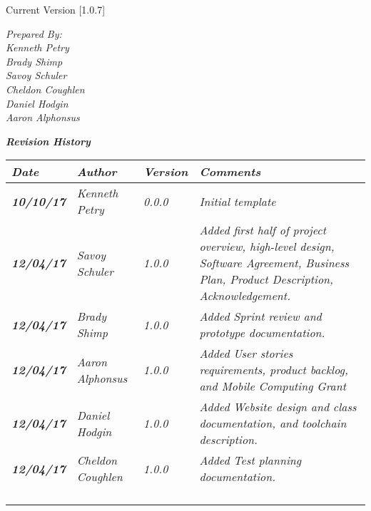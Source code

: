


Current Version [1.0.7]
\vspace*{5mm}

{\color{SDColor5}
\noindent
\textit{Prepared By:}\\
\textit{Kenneth Petry}\\
\textit{Brady Shimp}\\
\textit{Savoy Schuler}\\
\textit{Cheldon Coughlen}\\
\textit{Daniel Hodgin}\\
\textit{Aaron Alphonsus}
}

\vfill
\noindent
{\color{SDColor3} \textit{\textbf{Revision History}}}\\
\begin{tabular}{|>{\raggedright}p{1.5cm}|>{\raggedright}p{3cm}|>{\raggedright}p{1.5cm}|>{\raggedright}p{9cm}|}
  \hline
  \textit{\textbf{Date}} &  \textit{\textbf{Author}} & \textit{\textbf{Version}} & \textit{\textbf{Comments}}\tabularnewline
  \hline
  \textit{\textbf{10/10/17}} & \textit{Kenneth Petry} & \textit{0.0.0} & \textit{Initial template}\tabularnewline\hline
  \textit{\textbf{12/04/17}} & \textit{Savoy Schuler} & \textit{1.0.0} & \textit{Added first half of project overview, high-level design, Software Agreement, Business Plan, Product Description, Acknowledgement.}\tabularnewline\hline
  \textit{\textbf{12/04/17}} & \textit{Brady Shimp} & \textit{1.0.0} & \textit{Added Sprint review and prototype documentation.}\tabularnewline\hline
  \textit{\textbf{12/04/17}} & \textit{Aaron Alphonsus} & \textit{1.0.0} & \textit{Added User stories requirements, product backlog, and Mobile Computing Grant}\tabularnewline\hline
  \textit{\textbf{12/04/17}} & \textit{Daniel Hodgin} & \textit{1.0.0} & \textit{Added Website design and class documentation, and toolchain description.}\tabularnewline\hline
  \textit{\textbf{12/04/17}} & \textit{Cheldon Coughlen} & \textit{1.0.0} & \textit{Added Test planning documentation.}\tabularnewline\hline
  &  &  & \tabularnewline
  \hline
  &  &  & \tabularnewline
  \hline
  &  &  & \tabularnewline
  \hline
  &  &  & \tabularnewline
  \hline
\end{tabular}
\vfill


